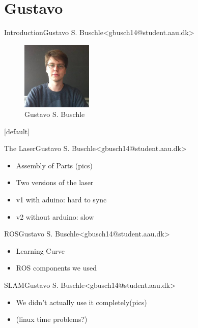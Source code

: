 \section{Gustavo}

\begin{frame}{Introduction}{Gustavo S. Buschle\newline<gbusch14@student.aau.dk>}
    \begin{figure}[h!]
        \includegraphics[width=0.3\textwidth]{images/gustavo.jpg}
        \caption{Gustavo S. Buschle}
        \centering
    \end{figure}
\end{frame}
[default]

\begin{frame}{The Laser}{Gustavo S. Buschle\newline<gbusch14@student.aau.dk>}
    \begin{itemize}
        \item <1-> Assembly of Parts (pics)
        \item <2-> Two versions of the laser
        \item <3-> v1 with aduino: hard to sync
        \item <4-> v2 without arduino: slow
    \end{itemize}
\end{frame}

\begin{frame}{ROS}{Gustavo S. Buschle\newline<gbusch14@student.aau.dk>}
    \begin{itemize}
        \item <1-> Learning Curve
        \item <2-> ROS components we used
    \end{itemize}
\end{frame}

\begin{frame}{SLAM}{Gustavo S. Buschle\newline<gbusch14@student.aau.dk>}
    \begin{itemize}
        \item <1-> We didn't actually use it completely(pics)
        \item <2-> (linux time problems?)
    \end{itemize}
\end{frame}
